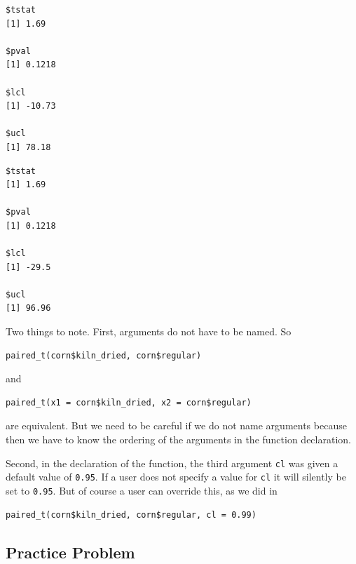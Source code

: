 \documentclass[]{krantz}
\makeatletter
\newenvironment{Shaded}{\begin{snugshade}}{\end{snugshade}}
\newcommand{\KeywordTok}[1]{\textcolor[rgb]{0.27,0.27,0.27}{\textbf{#1}}}
\newcommand{\DataTypeTok}[1]{\textcolor[rgb]{0.27,0.27,0.27}{#1}}
\newcommand{\FloatTok}[1]{\textcolor[rgb]{0.06,0.06,0.06}{#1}}
\newcommand{\StringTok}[1]{\textcolor[rgb]{0.5,0.5,0.5}{#1}}
\newcommand{\OperatorTok}[1]{\textcolor[rgb]{0.43,0.43,0.43}{\textbf{#1}}}
\newcommand{\NormalTok}[1]{#1}
\newenvironment{kframe}{%
\medskip{}
\setlength{\fboxsep}{.8em}
 \def\at@end@of@kframe{}%
 \ifinner\ifhmode%
  \def\at@end@of@kframe{\end{minipage}}%
  \begin{minipage}{\columnwidth}%
 \fi\fi%
 \def\FrameCommand##1{\hskip\@totalleftmargin \hskip-\fboxsep
 \colorbox{shadecolor}{##1}\hskip-\fboxsep
     \hskip-\linewidth \hskip-\@totalleftmargin \hskip\columnwidth}%
 \MakeFramed {\advance\hsize-\width
   \@totalleftmargin\z@ \linewidth\hsize
   \@setminipage}}%
 {\par\unskip\endMakeFramed%
 \at@end@of@kframe}
\renewenvironment{Shaded}{\begin{kframe}}{\end{kframe}}
\makeatother
\begin{document}
\begin{verbatim}
$tstat
[1] 1.69

$pval
[1] 0.1218

$lcl
[1] -10.73

$ucl
[1] 78.18
\end{verbatim}

\begin{Shaded}
\end{Shaded}

\begin{verbatim}
$tstat
[1] 1.69

$pval
[1] 0.1218

$lcl
[1] -29.5

$ucl
[1] 96.96
\end{verbatim}

Two things to note. First, arguments do not have to be named. So

\begin{verbatim}
paired_t(corn$kiln_dried, corn$regular)
\end{verbatim}

and

\begin{verbatim}
paired_t(x1 = corn$kiln_dried, x2 = corn$regular)
\end{verbatim}

are equivalent. But we need to be careful if we do not name arguments
because then we have to know the ordering of the arguments in the
function declaration.

Second, in the declaration of the function, the third argument
\texttt{cl} was given a default value of \texttt{0.95}. If a user does
not specify a value for \texttt{cl} it will silently be set to
\texttt{0.95}. But of course a user can override this, as we did in

\begin{verbatim}
paired_t(corn$kiln_dried, corn$regular, cl = 0.99)
\end{verbatim}

\subsection{Practice Problem}\label{practice-problem-11}
\end{document}
